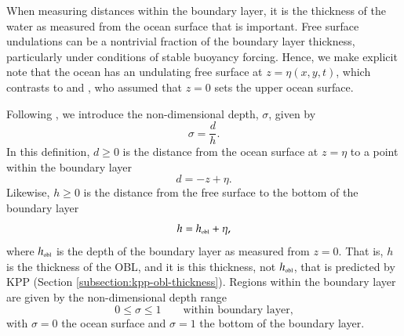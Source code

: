 When measuring distances within the boundary layer, it is the
thickness of the water as measured from the ocean surface that is
important. Free surface undulations can be a nontrivial fraction of
the boundary layer thickness, particularly under conditions of stable
buoyancy forcing. Hence, we make explicit note that the ocean has an
undulating free surface at $z=\eta(x,y,t)$, which contrasts to
\cite{LargeKPP} and \cite{LargeKPP_lectures}, who assumed that $z=0$
sets the upper ocean surface.

Following \cite{LargeKPP}, we introduce the non-dimensional depth,
$\sigma$, given by 
\begin{equation}
  \sigma = \frac{d}{h}.
\label{eq:sigma-defined}
\end{equation}
In this definition, $d \ge 0$ is the distance from the ocean surface
at $z=\eta$ to a point within the boundary layer
\begin{equation}
  d = -z+\eta.
\label{eq:distance-from-surface-defined}
\end{equation}
Likewise, $h \ge 0$ is the distance from the free surface 
to the bottom of the boundary layer
\begin{equation}
  h = h_{\mbox{\tiny obl}} +\eta,
\label{eq:h-obl-defined}
\end{equation}
where $h_{\mbox{\tiny obl}}$ is the depth of the boundary layer as
measured from $z=0$. That is, $h$ is the thickness of the OBL, and it is this 
thickness, not $h_{\mbox{\tiny obl}}$, that is
predicted  by KPP (Section \ref{subsection:kpp-obl-thickness}).
Regions within the boundary layer are given by the non-dimensional
depth range
\begin{equation}
  0 \le \sigma \le 1 \qquad \mbox{within boundary layer,}
\end{equation}
with $\sigma=0$ the ocean surface and $\sigma = 1$ the bottom of the
boundary layer.



